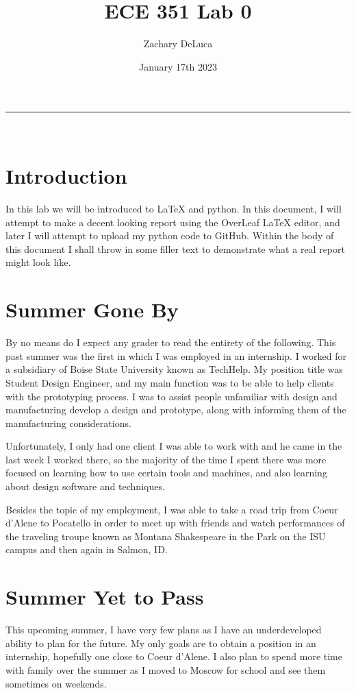 \documentclass[12pt,a4paper]{article}
\title{ECE 351 Lab 0}
\author{Zachary DeLuca  }
\date{January 17th 2023}
\newcommand{\HRule}{\rule{\linewidth}{0.5mm}}
\begin{document}
\maketitle
\HRule \\[1mm]
\section{Introduction}
In this lab we will be introduced to LaTeX and python. In this document, I will attempt to make a decent looking report using the OverLeaf LaTeX editor, and later I will attempt to upload my python code to GitHub. Within the body of this document I shall throw in some filler text to demonstrate what a real report might look like.
\section{Summer Gone By}
        By no means do I expect any grader to read the entirety of the following. 
    This past summer was the first in which I was employed in an internship. I worked for a subsidiary of Boise State University known as TechHelp. My position title was Student Design Engineer, and my main function was to be able to help clients with the prototyping process. I was to assist people unfamiliar with design and manufacturing develop a design and prototype, along with informing them of the manufacturing considerations. 

    Unfortunately, I only had one client I was able to work with and he came in the last week I worked there, so the majority of the time I spent there was more focused on learning how to use certain tools and machines, and also learning about design software and techniques. 

    Besides the topic of my employment, I was able to take a road trip from Coeur d'Alene to Pocatello in order to meet up with friends and watch performances of the traveling troupe known as Montana Shakespeare in the Park on the ISU campus and then again in Salmon, ID. 
    
\section{Summer Yet to Pass}
This upcoming summer, I have very few plans as I have an underdeveloped ability to plan for the future. My only goals are to obtain a position in an internship, hopefully one close to Coeur d'Alene. I also plan to spend more time with family over the summer as I moved to Moscow for school and see them sometimes on weekends. 
\end{document}
